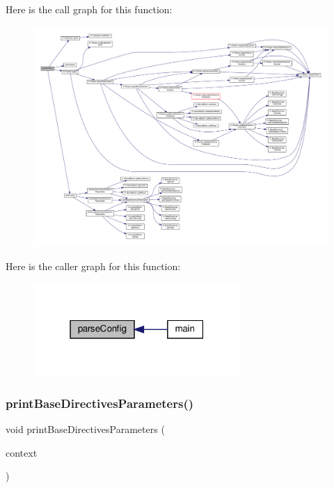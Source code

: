 Here is the call graph for this function\+:
\nopagebreak
\begin{figure}[H]
\begin{center}
\leavevmode
\includegraphics[width=350pt]{classft_1_1_print_config_afb9aa52211052c2ac541dd130558da0a_cgraph}
\end{center}
\end{figure}
Here is the caller graph for this function\+:
\nopagebreak
\begin{figure}[H]
\begin{center}
\leavevmode
\includegraphics[width=223pt]{classft_1_1_print_config_afb9aa52211052c2ac541dd130558da0a_icgraph}
\end{center}
\end{figure}
\mbox{\label{classft_1_1_print_config_ad71821d54e46c04a81d26dbabd3c4b20}} 
\subsubsection{\texorpdfstring{print\+Base\+Directives\+Parameters()}{printBaseDirectivesParameters()}}
{\footnotesize\ttfamily void print\+Base\+Directives\+Parameters (\begin{DoxyParamCaption}\item[{\hyperlink{classft_1_1_base_directives}{ft\+::\+Base\+Directives} \&}]{context }\end{DoxyParamCaption})\hspace{0.3cm}{\ttfamily [static]}}



